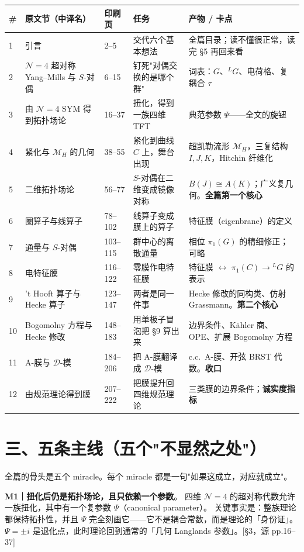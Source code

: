 \documentclass[11pt,a4paper]{article}
\newcommand{\MH}{\mathcal{M}_H}
\newcommand{\Ldual}{{}^L\!G}
\newcommand{\Nfour}{\mathcal{N}=4}
\newcommand{\src}[1]{{\color{gray!70}\footnotesize[#1]}}
\begin{document}
\begin{center}\small
\begin{longtable}{@{}p{0.6cm}p{3.4cm}p{1.1cm}p{4.6cm}p{4.6cm}@{}}
\toprule
\# & 原文节（中译名） & 印刷页 & 任务 & 产物 / 卡点 \\
\midrule
\endhead
1 & 引言 & 2--5 & 交代六个基本想法 & 全篇目录；读不懂很正常，读完 \S5 再回来看 \\
2 & $\Nfour$ 超对称 Yang--Mills 与 $S$-对偶 & 6--15 & 钉死"对偶交换的是哪个群" & 词表：$G$、$\Ldual$、电荷格、复耦合 $\tau$ \\
3 & 由 $\Nfour$ SYM 得到拓扑场论 & 16--37 & 扭化，得到一族四维 TFT & 典范参数 $\Psi$——全文的旋钮 \\
4 & 紧化与 $\MH${} 的几何 & 38--55 & 紧化到曲线 $C$ 上，舞台出现 & 超凯勒流形 $\MH$，三复结构 $I,J,K$，Hitchin 纤维化 \\
5 & 二维拓扑场论 & 56--77 & $S$-对偶在二维变成镜像对称 & $B(J)\cong A(K)$；广义复几何。\textbf{全篇第一个核心} \\
6 & 圈算子与线算子 & 78--102 & 线算子变成膜上的算子 & 特征膜（eigenbrane）的定义 \\
7 & 通量与 $S$-对偶 & 103--115 & 群中心的离散通量 & 相位 $\pi_1(G)$ 的精细修正；可略 \\
8 & 电特征膜 & 116--122 & 零膜作电特征膜 & 特征膜 $\leftrightarrow$ $\pi_1(C)\to\Ldual$ 的表示 \\
9 & 't Hooft 算子与 Hecke 算子 & 123--147 & 两者是同一件事 & Hecke 修改的同构类、仿射 Grassmann。\textbf{第二个核心} \\
10 & Bogomolny 方程与 Hecke 修改 & 148--183 & 用单极子冒泡把 \S9 算出来 & 边界条件、Kähler 商、OPE、扩展 Bogomolny 方程 \\
11 & A-膜与 $\mathcal{D}$-模 & 184--206 & 把 A-膜翻译成 $\mathcal{D}$-模 & c.c.\ A-膜、开弦 BRST 代数。\textbf{收口} \\
12 & 由规范理论得到膜 & 207--222 & 把膜提升回四维规范理论 & 三类膜的边界条件；\textbf{诚实度指标} \\
\bottomrule
\end{longtable}
\end{center}

\section*{三、五条主线（五个"不显然之处"）}

全篇的骨头是五个 miracle。每个 miracle 都是一句"如果这成立，对应就成立"。

\textbf{M1｜扭化后仍是拓扑场论，且只依赖一个参数}。%
四维 $\Nfour$ 的超对称代数允许一族扭化，其中有一个复参数 $\Psi$（canonical parameter）。
关键事实是：整族理论都保持拓扑性，并且 $\Psi$ 完全刻画它——它不是耦合常数，而是理论的「身份证」。
$\Psi=\pm i$ 是退化点，此时理论回到通常的「几何 Langlands 参数」。\src{\S3，源 pp.16--37}
\end{document}
